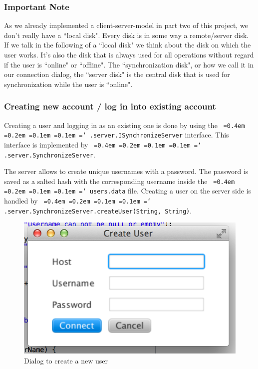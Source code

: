 \documentclass[a4paper,12pt]{article}
\newcommand*\justify{%
  \fontdimen2\font=0.4em%
  \fontdimen3\font=0.2em%
  \fontdimen4\font=0.1em%
  \fontdimen7\font=0.1em%
  \hyphenchar\font=`\-%
}
\newcommand{\mono}[1]{\texttt{\justify #1}}
\begin{document}
\subsubsection{Important Note}
As we already implemented a client-server-model in part two of this project, we don't really have a ``local disk". Every disk is in some way a remote/server disk. If we talk in the following of a ``local disk" we think about the disk on which the user works. It's also the disk that is always used for all operations without regard if the user is ``online" or ``offline". The ``synchronization disk", or how we call it in our connection dialog, the ``server disk" is the central disk that is used for synchronization while the user is ``online".

\subsubsection{Creating new account / log in into existing account}
Creating a user and logging in as an existing one is done by using the \mono{.server.ISynchronizeServer} interface. This interface is implemented by \mono{.server.SynchronizeServer}.

The server allows to create unique usernames with a password. The password is saved as a salted hash with the corresponding username inside the \mono{users.data} file. Creating a user on the server side is handled by \mono{.server.SynchronizeServer.createUser(String, String)}.

\begin{figure}[h]\centering
    \includegraphics[scale=0.7]{createuser.png}
    \caption{Dialog to create a new user}
\end{figure}
\end{document}
